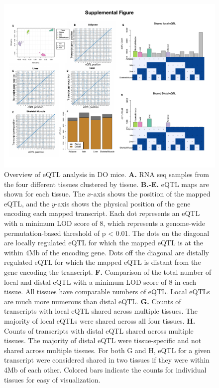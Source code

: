 \documentclass[
]{article}
\begin{document}
\begin{figure}[ht!]
\includegraphics[width=\textwidth]{Figures/Supp_Fig_eQTL.pdf} 
\caption{Overview of eQTL analysis in DO mice. \textbf{A.} RNA seq 
samples from the four different tissues clustered by tissue. 
\textbf{B.-E.} eQTL maps are shown for each tissue. The $x$-axis 
shows the position of the mapped eQTL, and the $y$-axis shows the 
physical position of the gene encoding each mapped transcript. 
Each dot represents an eQTL with a minimum LOD score of 8, which 
represents a genome-wide permutation-based threshold of p < 0.01. The 
dots on the diagonal are locally regulated eQTL for which the mapped 
eQTL is at the within 4Mb of the encoding gene. Dots off the diagonal 
are distally regulated eQTL for which the mapped eQTL is distant from 
the gene encoding the transcript. \textbf{F.} Comparison of the total 
number of local and distal eQTL with a minimum LOD score of 8 in each 
tissue. All tissues have comparable numbers of eQTL. Local eQTLs are 
much more numerous than distal eQTL. \textbf{G.} Counts of transcripts 
with local eQTL shared across multiple tissues. The majority of local 
eQTLs were shared across all four tissues. \textbf{H.} Counts of 
transcripts with distal eQTL shared across multiple tissues. The majority 
of distal eQTL were tissue-specific and not shared across multiple tissues. 
For both G and H, eQTL for a given transcript were considered shared in two 
tissues if they were within 4Mb of each other. Colored bars indicate the 
counts for individual tissues for easy of visualization.
}
\label{fig:eQTL}
\end{figure}
\end{document}
